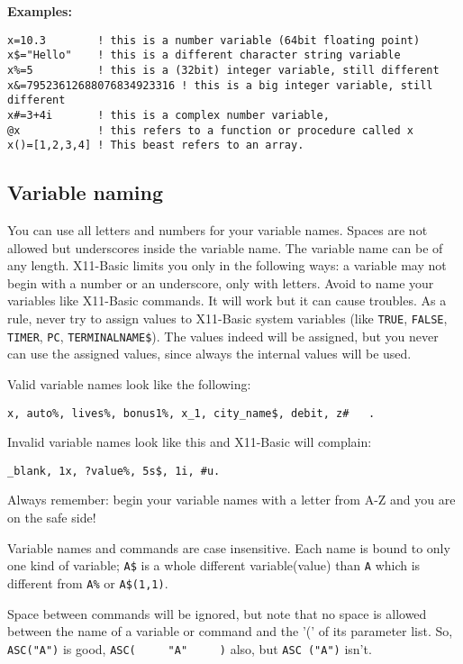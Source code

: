 \begin{mdframed}[hidealllines=true,backgroundcolor=blue!20]
{\bf Examples:}
\begin{verbatim}
x=10.3        ! this is a number variable (64bit floating point)
x$="Hello"    ! this is a different character string variable
x%=5          ! this is a (32bit) integer variable, still different
x&=79523612688076834923316 ! this is a big integer variable, still different
x#=3+4i       ! this is a complex number variable, 
@x            ! this refers to a function or procedure called x
x()=[1,2,3,4] ! This beast refers to an array.
\end{verbatim}
\end{mdframed}

\subsection{Variable naming}

You can use all letters and numbers for your variable names. Spaces are not
allowed but underscores inside the variable name. The variable name can be of
any length. X11-Basic limits you only in the following ways: a variable may not
begin with a number or an underscore, only with letters. Avoid to name your
variables like X11-Basic commands. It will work but it can cause troubles. As a
rule, never try to assign values to X11-Basic system variables (like 
\verb|TRUE|, \verb|FALSE|, \verb|TIMER|, \verb|PC|, \verb|TERMINALNAME$|). The
values indeed will be assigned, but you never can use the assigned values, since
always the internal values will be used.

Valid variable names look like the following: 
\begin{verbatim}
x, auto%, lives%, bonus1%, x_1, city_name$, debit, z#   . 
\end{verbatim}

Invalid variable names look like this and X11-Basic
will complain: 
\begin{verbatim}
_blank, 1x, ?value%, 5s$, 1i, #u. 
\end{verbatim}
Always remember: begin your variable names with a letter from A-Z and you are on
the safe side!

Variable names and commands are case insensitive. Each name is bound to only
one kind of variable; \verb|A$| is a whole different variable(value) than
\verb|A| which is different from \verb|A%| or \verb|A$(1,1)|.

Space between commands will be ignored, but note that no space is allowed 
between the name of a variable or command and the '(' of its parameter list. 
So, \verb|ASC("A")| is good, \verb|ASC(     "A"     )| also,
but \verb|ASC ("A")| isn't.

